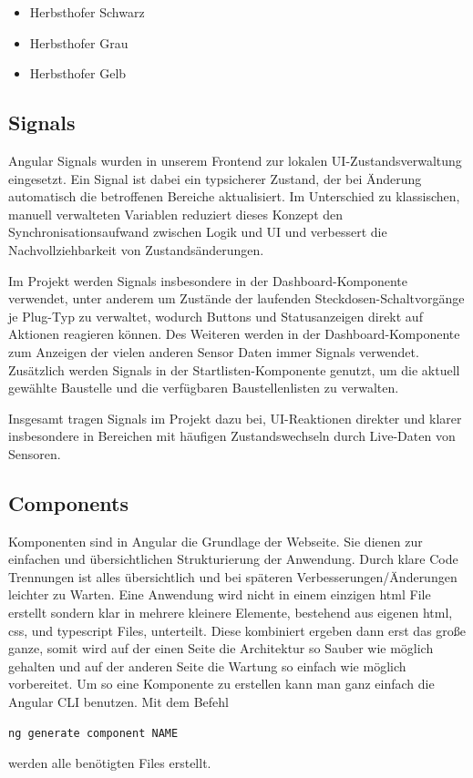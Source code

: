 
\begin{itemize}
\item \textcolor{HerbsthoferBlack}{Herbsthofer Schwarz}
\item \textcolor{HerbsthoferLightGray}{Herbsthofer Grau}
\item \textcolor{HerbsthoferYellow}{Herbsthofer Gelb}
\end{itemize}

\subsection{Signals}
Angular Signals wurden in unserem Frontend zur lokalen UI-Zustandsverwaltung eingesetzt. Ein Signal ist dabei ein typsicherer Zustand, der bei Änderung automatisch die betroffenen Bereiche aktualisiert. Im Unterschied zu klassischen, manuell verwalteten Variablen reduziert dieses Konzept den Synchronisationsaufwand zwischen Logik und UI und verbessert die Nachvollziehbarkeit von Zustandsänderungen.

Im Projekt werden Signals insbesondere in der Dashboard-Komponente verwendet, unter anderem um Zustände der laufenden Steckdosen-Schaltvorgänge je Plug-Typ zu verwaltet, wodurch Buttons und Statusanzeigen direkt auf Aktionen reagieren können. Des Weiteren werden in der Dashboard-Komponente zum Anzeigen der vielen anderen Sensor Daten immer Signals verwendet. Zusätzlich werden Signals in der Startlisten-Komponente genutzt, um die aktuell gewählte Baustelle und die verfügbaren Baustellenlisten zu verwalten.

Insgesamt tragen Signals im Projekt dazu bei, UI-Reaktionen direkter und klarer insbesondere in Bereichen mit häufigen Zustandswechseln durch Live-Daten von Sensoren.

\subsection{Components}

Komponenten sind in Angular die Grundlage der Webseite. Sie dienen zur einfachen und übersichtlichen Strukturierung der Anwendung. Durch klare Code Trennungen ist alles übersichtlich und bei späteren Verbesserungen/Änderungen leichter zu Warten.
Eine Anwendung wird nicht in einem einzigen html File erstellt sondern klar in mehrere kleinere Elemente, bestehend aus eigenen html, css, und typescript Files, unterteilt. Diese kombiniert ergeben dann erst das große ganze, somit wird auf der einen Seite die Architektur so Sauber wie möglich gehalten und auf der anderen Seite die Wartung so einfach wie möglich vorbereitet.
Um so eine Komponente zu erstellen kann man ganz einfach die Angular CLI benutzen. Mit dem Befehl
\begin{lstlisting}[language=bash, caption={erstellen einer Komponente in der Angular CLI}]
ng generate component NAME
\end{lstlisting}
werden alle benötigten Files erstellt.

